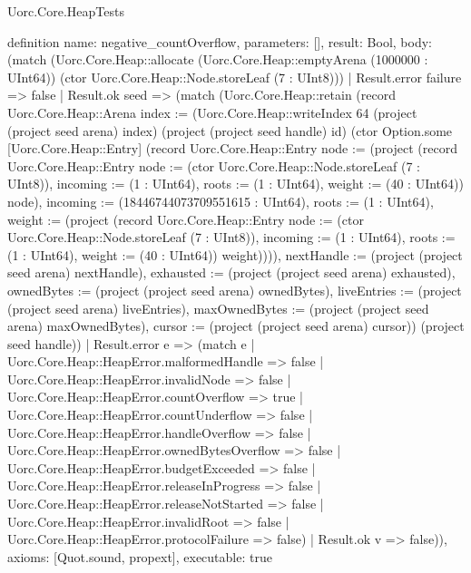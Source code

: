 \begin{lexlean}{Uorc.Core.HeapTests}
\begin{semanticmodule}
definition{
  name: negative_countOverflow,
  parameters: [],
  result: Bool,
  body: (match (Uorc.Core.Heap::allocate (Uorc.Core.Heap::emptyArena (1000000 : UInt64)) (ctor Uorc.Core.Heap::Node.storeLeaf (7 : UInt8)))
    | Result.error failure => false
    | Result.ok seed => (match (Uorc.Core.Heap::retain (record Uorc.Core.Heap::Arena {index := (Uorc.Core.Heap::writeIndex 64 (project (project seed arena) index) (project (project seed handle) id) (ctor Option.some [Uorc.Core.Heap::Entry] (record Uorc.Core.Heap::Entry {node := (project (record Uorc.Core.Heap::Entry {node := (ctor Uorc.Core.Heap::Node.storeLeaf (7 : UInt8)), incoming := (1 : UInt64), roots := (1 : UInt64), weight := (40 : UInt64)}) node), incoming := (18446744073709551615 : UInt64), roots := (1 : UInt64), weight := (project (record Uorc.Core.Heap::Entry {node := (ctor Uorc.Core.Heap::Node.storeLeaf (7 : UInt8)), incoming := (1 : UInt64), roots := (1 : UInt64), weight := (40 : UInt64)}) weight)}))), nextHandle := (project (project seed arena) nextHandle), exhausted := (project (project seed arena) exhausted), ownedBytes := (project (project seed arena) ownedBytes), liveEntries := (project (project seed arena) liveEntries), maxOwnedBytes := (project (project seed arena) maxOwnedBytes), cursor := (project (project seed arena) cursor)}) (project seed handle))
      | Result.error e => (match e
        | Uorc.Core.Heap::HeapError.malformedHandle => false
        | Uorc.Core.Heap::HeapError.invalidNode => false
        | Uorc.Core.Heap::HeapError.countOverflow => true
        | Uorc.Core.Heap::HeapError.countUnderflow => false
        | Uorc.Core.Heap::HeapError.handleOverflow => false
        | Uorc.Core.Heap::HeapError.ownedBytesOverflow => false
        | Uorc.Core.Heap::HeapError.budgetExceeded => false
        | Uorc.Core.Heap::HeapError.releaseInProgress => false
        | Uorc.Core.Heap::HeapError.releaseNotStarted => false
        | Uorc.Core.Heap::HeapError.invalidRoot => false
        | Uorc.Core.Heap::HeapError.protocolFailure => false)
      | Result.ok v => false)),
  axioms: [Quot.sound, propext],
  executable: true
}


\end{semanticmodule}
\end{lexlean}
